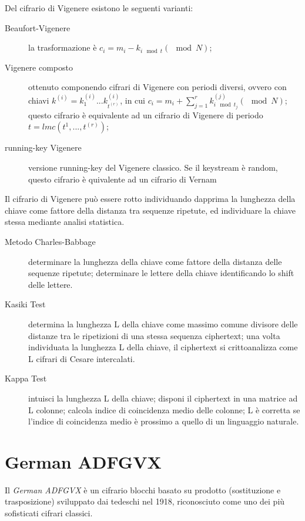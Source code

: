 Del cifrario di Vigenere esistono le seguenti varianti:
\begin{description}
  \item[Beaufort-Vigenere] la trasformazione è $c_{i}=m_{i}-k_{i \mod t}(\mod N)$;

  \item[Vigenere composto] ottenuto componendo cifrari di Vigenere con periodi diversi, ovvero con chiavi $k^{(i)}=k_{1}^{(i)}...k_{t^{(r)}}^{(i)}$, in cui
  $c_{i}=m_{i}+\sum_{j=1}^{r} k_{i \mod t_{j}}^{(j)}(\mod N)$; questo cifrario è equivalente ad un cifrario di Vigenere di periodo $t=lmc(t^{1},...,t^{(r)})$;

  \item[running-key Vigenere] versione running-key del Vigenere classico. Se il keystream è random, questo cifrario è quivalente ad un cifrario di Vernam
\end{description}

Il cifrario di Vigenere può essere rotto individuando dapprima la lunghezza della chiave come fattore della distanza tra sequenze ripetute, ed individuare la chiave stessa mediante analisi statistica.

\begin{description}
  \item[Metodo Charles-Babbage] determinare la lunghezza della chiave come fattore della distanza delle sequenze ripetute; determinare le lettere della chiave identificando lo shift delle lettere.
  \item[Kasiki Test] determina la lunghezza L della chiave come massimo comune divisore delle distanze tra le ripetizioni di una stessa sequenza ciphertext; una volta individuata la lunghezza L della chiave, il ciphertext si crittoanalizza come L cifrari di Cesare intercalati.
  \item[Kappa Test] intuisci la lunghezza L della chiave; disponi il ciphertext in una matrice ad L colonne; calcola indice di coincidenza medio delle colonne; L è corretta se l'indice di coincidenza medio è prossimo a quello di un linguaggio naturale.
\end{description}


\section{German ADFGVX}
Il \textit{German ADFGVX} è un cifrario blocchi basato su prodotto (sostituzione e trasposizione) sviluppato dai tedeschi nel 1918, riconosciuto come uno dei più sofisticati cifrari classici.

